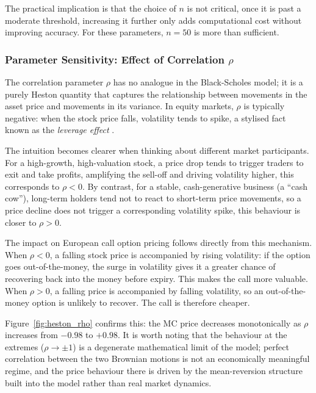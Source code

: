 \documentclass[a4paper,11pt, titlepage]{article}
\theoremstyle{definition}
\theoremstyle{plain}
\theoremstyle{remark}
\begin{document}
The practical implication is that the choice of $n$ is not critical, once it is past a moderate threshold, increasing it further only adds computational cost without improving accuracy. For these parameters, $n = 50$ is more than sufficient.

\FloatBarrier

\subsubsection{Parameter Sensitivity: Effect of Correlation $\rho$}

The correlation parameter $\rho$ has no analogue in the Black-Scholes model; it is a purely Heston quantity that captures the relationship between movements in the asset price and movements in its variance. In equity markets, $\rho$ is typically negative: when the stock price falls, volatility tends to spike, a stylised fact known as the \textit{leverage effect} \cite{black1976}.

The intuition becomes clearer when thinking about different market participants. For a high-growth, high-valuation stock, a price drop tends to trigger traders to exit and take profits, amplifying the sell-off and driving volatility higher, this corresponds to $\rho < 0$. By contrast, for a stable, cash-generative business (a ``cash cow''), long-term holders tend not to react to short-term price movements, so a price decline does not trigger a corresponding volatility spike, this behaviour is closer to $\rho > 0$.

The impact on European call option pricing follows directly from this mechanism. When $\rho < 0$, a falling stock price is accompanied by rising volatility: if the option goes out-of-the-money, the surge in volatility gives it a greater chance of recovering back into the money before expiry. This makes the call more valuable. When $\rho > 0$, a falling price is accompanied by falling volatility, so an out-of-the-money option is unlikely to recover. The call is therefore cheaper.

Figure~\ref{fig:heston_rho} confirms this: the MC price decreases monotonically as $\rho$ increases from $-0.98$ to $+0.98$. It is worth noting that the behaviour at the extremes ($\rho \to \pm 1$) is a degenerate mathematical limit of the model; perfect correlation between the two Brownian motions is not an economically meaningful regime, and the price behaviour there is driven by the mean-reversion structure built into the model rather than real market dynamics.
\end{document}
